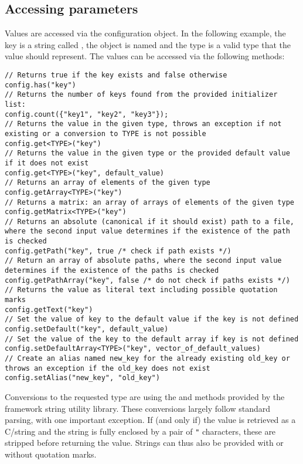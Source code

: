 \subsection{Accessing parameters}
\label{sec:accessing_parameters}
Values are accessed via the configuration object.
In the following example, the key is a string called , the object is named  and the type  is a valid \CPP type that the value should represent.
The values can be accessed via the following methods:
\begin{verbatim}
// Returns true if the key exists and false otherwise
config.has("key")
// Returns the number of keys found from the provided initializer list:
config.count({"key1", "key2", "key3"});
// Returns the value in the given type, throws an exception if not existing or a conversion to TYPE is not possible
config.get<TYPE>("key")
// Returns the value in the given type or the provided default value if it does not exist
config.get<TYPE>("key", default_value)
// Returns an array of elements of the given type
config.getArray<TYPE>("key")
// Returns a matrix: an array of arrays of elements of the given type
config.getMatrix<TYPE>("key")
// Returns an absolute (canonical if it should exist) path to a file, where the second input value determines if the existence of the path is checked
config.getPath("key", true /* check if path exists */)
// Return an array of absolute paths, where the second input value determines if the existence of the paths is checked
config.getPathArray("key", false /* do not check if paths exists */)
// Returns the value as literal text including possible quotation marks
config.getText("key")
// Set the value of key to the default value if the key is not defined
config.setDefault("key", default_value)
// Set the value of the key to the default array if key is not defined
config.setDefaultArray<TYPE>("key", vector_of_default_values)
// Create an alias named new_key for the already existing old_key or throws an exception if the old_key does not exist
config.setAlias("new_key", "old_key")
\end{verbatim}

Conversions to the requested type are using the  and  methods provided by the framework string utility library.
These conversions largely follow standard \CPP parsing, with one important exception.
If (and only if) the value is retrieved as a C/\CPP string and the string is fully enclosed by a pair of \texttt{"} characters, these are stripped before returning the value.
Strings can thus also be provided with or without quotation marks.

